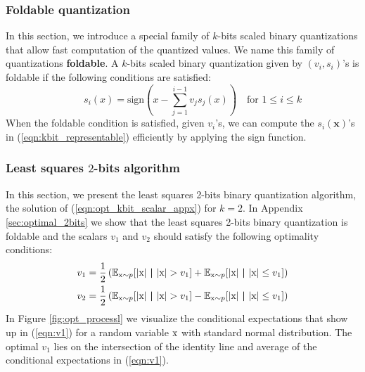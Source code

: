 \documentclass[10pt,twocolumn,letterpaper]{article}
\def\rx{{\textnormal{x}}}
\def\vx{{\bm{x}}}
\newcommand{\E}{\mathbb{E}}
\begin{document}
\subsubsection{Foldable quantization} \label{sec:foldable}
In this section, we introduce a special family of $k$-bits scaled binary quantizations that allow fast computation of the quantized values. We name this family of quantizations {\bf foldable}. A $k$-bits scaled binary quantization given by  $(v_i, s_i)$'s is foldable if the following conditions are satisfied:
\begin{equation} \label{eqn:foldable}
\quad \quad s_i(x) = \text{sign}(x - \sum_{j=1}^{i-1} v_j s_j(x)) \quad  \text{for } 1\le i \le k
\end{equation}
When the foldable condition is satisfied, given $v_i$'s, we can compute the $s_i(\vx)$'s in (\ref{eqn:kbit_representable}) efficiently by applying the sign function.

\subsubsection{Least squares $2$-bits algorithm} \label{sec:2bits_sign_appx}
In this section, we present the least squares 2-bits binary quantization algorithm, the solution of (\ref{eqn:opt_kbit_scalar_appx}) for $k=2$. In  Appendix \ref{sec:optimal_2bits} we show that the least squares 2-bits binary quantization is foldable and the scalars $v_1$ and $v_2$ should satisfy the following optimality conditions:
\begin{gather}
\label{eqn:v1}
v_1 = \frac{1}{2} \left(  \E_{\rx\sim p} [ |\rx| ~\bm{|}~ |\rx| > v_1] +  \E_{\rx\sim p}[ |\rx| ~\bm{|}~ |\rx| \le v_1] \right)\\
\label{eqn:v2}
v_2 = \frac{1}{2} \left(  \E_{\rx\sim p} [ |\rx| ~\bm{|}~ |\rx| > v_1] -  \E_{\rx\sim p}[ |\rx| ~\bm{|}~ |\rx| \le v_1] \right)
\end{gather}
In Figure \ref{fig:opt_processl} we visualize the conditional expectations that show up in (\ref{eqn:v1}) for a random variable $\rx$ with standard normal distribution. The optimal $v_1$ lies on the intersection of the identity line and average of the conditional expectations in  (\ref{eqn:v1}).
\end{document}
